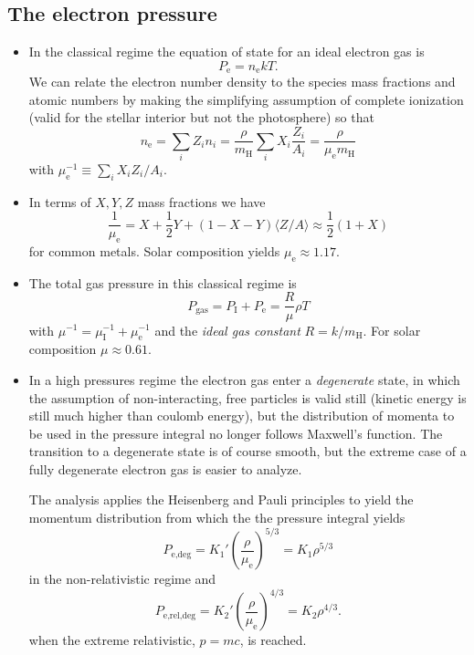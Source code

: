 \documentclass[10pt,amsmath,amssymb,aps,pra]{revtex4-2}
\newcommand{\sub}[1]{_{\text{#1}}}
\newcommand{\mh}{m\sub{H}}
\newcommand{\mean}[1]{\langle{#1}\rangle}
\begin{document}
\subsection{The electron pressure}
\begin{itemize}
\item In the classical regime the equation of state for an ideal electron gas is
\begin{equation}
P\sub{e} = n\sub{e}kT.
\end{equation}
We can relate the electron number density to the species mass fractions and
atomic numbers by making the simplifying assumption of complete ionization 
(valid for the stellar interior but not the photosphere) so that
\begin{equation}
n\sub{e} = \sum_iZ_in_i = \frac{\rho}{\mh}\sum_iX_i\frac{Z_i}{A_i} =
\frac{\rho}{\mu\sub{e}\mh}
\end{equation}
with $\mu\sub{e}^{-1}\equiv\sum_iX_iZ_i/A_i$.

\item In terms of $X,Y,Z$ mass fractions we have
\begin{equation}
\frac{1}{\mu\sub{e}} = X + \frac{1}{2}Y + (1 - X - Y)\mean{Z/A}
\approx \frac{1}{2}(1 + X)
\end{equation}
for common metals. Solar composition yields $\mu\sub{e}\approx{1.17}.$

\item The total gas pressure in this classical regime is
\begin{equation}
P\sub{gas} = P\sub{I} + P\sub{e} = \frac{R}{\mu}\rho{T}
\end{equation}
with $\mu^{-1}=\mu\sub{I}^{-1}+\mu\sub{e}^{-1}$ and the \emph{ideal gas
constant} $R=k/\mh$. For solar composition $\mu\approx{0.61}$.



\item In a high pressures regime the electron gas enter a \emph{degenerate}
state, in which the assumption of non-interacting, free particles is valid still
(kinetic energy is still much higher than coulomb energy), but the distribution
of momenta to be used in the pressure integral no longer follows Maxwell's
function. The transition to a degenerate state is of course smooth, but the
extreme case of a fully degenerate electron gas is easier to analyze.

The analysis applies the Heisenberg and Pauli principles to yield the momentum
distribution from which the the pressure integral yields
\begin{equation}
P\sub{e,deg}=K_1'\left(\frac{\rho}{\mu\sub{e}}\right)^{5/3}=K_1\rho^{5/3}
\end{equation}
in the non-relativistic regime and
\begin{equation}
P\sub{e,rel,deg}=K_2'\left(\frac{\rho}{\mu\sub{e}}\right)^{4/3}=K_2\rho^{4/3}.
\end{equation}
when the extreme relativistic, $p=mc$, is reached.


\end{itemize}
\end{document}
